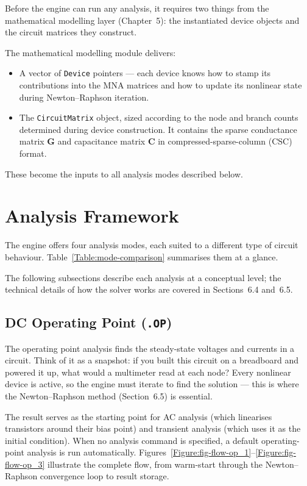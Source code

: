 Before the engine can run any analysis, it requires two things from the mathematical modelling layer (Chapter~5): the instantiated device objects and the circuit matrices they construct.

The mathematical modelling module delivers:
\begin{itemize}
  \item A vector of \texttt{Device} pointers --- each device knows how to stamp its contributions into the MNA matrices and how to update its nonlinear state during Newton--Raphson iteration.
  \item The \texttt{CircuitMatrix} object, sized according to the node and branch counts determined during device construction. It contains the sparse conductance matrix $\mathbf{G}$ and capacitance matrix $\mathbf{C}$ in compressed-sparse-column (CSC) format.
\end{itemize}

These become the inputs to all analysis modes described below.

\section{Analysis Framework}

The engine offers four analysis modes, each suited to a different type of circuit behaviour. Table~\ref{Table:mode-comparison} summarises them at a glance.

The following subsections describe each analysis at a conceptual level; the technical details of how the solver works are covered in Sections~6.4 and~6.5.

\subsection{DC Operating Point (\texttt{.OP})}

The operating point analysis finds the steady-state voltages and currents in a circuit. Think of it as a snapshot: if you built this circuit on a breadboard and powered it up, what would a multimeter read at each node? Every nonlinear device is active, so the engine must iterate to find the solution --- this is where the Newton--Raphson method (Section~6.5) is essential.

The result serves as the starting point for AC analysis (which linearises transistors around their bias point) and transient analysis (which uses it as the initial condition). When no analysis command is specified, a default operating-point analysis is run automatically. Figures~\ref{Figure:fig-flow-op_1}--\ref{Figure:fig-flow-op_3} illustrate the complete flow, from warm-start through the Newton--Raphson convergence loop to result storage.

